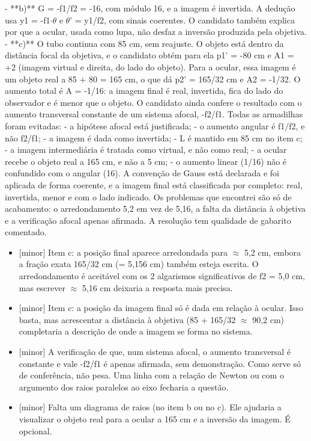 \documentclass{article}%
\begin{document}
{-} **b)** G = -f1/f2 = -16, com módulo 16, e a imagem é invertida. A dedução usa y1 = -f1$\cdot$$\theta$ e $\theta$' = y1/f2, com sinais coerentes. O candidato também explica por que a ocular, usada como lupa, não desfaz a inversão produzida pela objetiva.\newline%
{-} **c)** O tubo continua com 85 cm, sem reajuste. O objeto está dentro da distância focal da objetiva, e o candidato obtém para ela p1' = -80 cm e A1 = +2 (imagem virtual e direita, do lado do objeto). Para a ocular, essa imagem é um objeto real a 85 + 80 = 165 cm, o que dá p2' = 165/32 cm e A2 = -1/32. O aumento total é A = -1/16: a imagem final é real, invertida, fica do lado do observador e é menor que o objeto. O candidato ainda confere o resultado com o aumento transversal constante de um sistema afocal, -f2/f1.\newline%
\newline%
Todas as armadilhas foram evitadas:\newline%
{-} a hipótese afocal está justificada;\newline%
{-} o aumento angular é f1/f2, e não f2/f1;\newline%
{-} a imagem é dada como invertida;\newline%
{-} L é mantido em 85 cm no item c;\newline%
{-} a imagem intermediária é tratada como virtual, e não como real;\newline%
{-} a ocular recebe o objeto real a 165 cm, e não a 5 cm;\newline%
{-} o aumento linear (1/16) não é confundido com o angular (16).\newline%
\newline%
A convenção de Gauss está declarada e foi aplicada de forma coerente, e a imagem final está classificada por completo: real, invertida, menor e com o lado indicado. Os problemas que encontrei são só de acabamento: o arredondamento 5,2 em vez de 5,16, a falta da distância à objetiva e a verificação afocal apenas afirmada. A resolução tem qualidade de gabarito comentado.%
\begin{itemize}%
\item%
{[}minor{]} Item c: a posição final aparece arredondada para $\approx$ 5,2 cm, embora a fração exata 165/32 cm (= 5,156 cm) também esteja escrita. O arredondamento é aceitável com os 2 algarismos significativos de f2 = 5,0 cm, mas escrever $\approx$ 5,16 cm deixaria a resposta mais precisa.%
\item%
{[}minor{]} Item c: a posição da imagem final só é dada em relação à ocular. Isso basta, mas acrescentar a distância à objetiva (85 + 165/32 $\approx$ 90,2 cm) completaria a descrição de onde a imagem se forma no sistema.%
\item%
{[}minor{]} A verificação de que, num sistema afocal, o aumento transversal é constante e vale -f2/f1 é apenas afirmada, sem demonstração. Como serve só de conferência, não pesa. Uma linha com a relação de Newton ou com o argumento dos raios paralelos ao eixo fecharia a questão.%
\item%
{[}minor{]} Falta um diagrama de raios (no item b ou no c). Ele ajudaria a visualizar o objeto real para a ocular a 165 cm e a inversão da imagem. É opcional.%
\end{itemize}%
\end{document}
